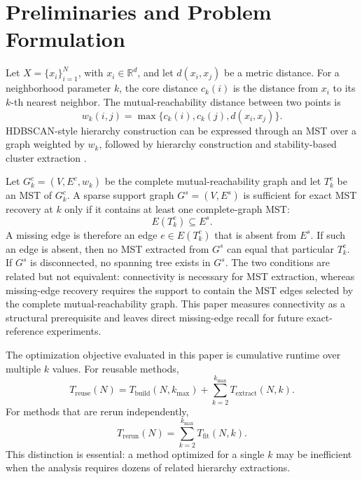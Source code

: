 \documentclass[11pt]{article}
\begin{document}
\section{Preliminaries and Problem Formulation}

Let \(X=\{x_i\}_{i=1}^{N}\), with \(x_i \in \mathbb{R}^{d}\), and let \(d(x_i,x_j)\) be a metric distance. For a neighborhood parameter \(k\), the core distance \(c_k(i)\) is the distance from \(x_i\) to its \(k\)-th nearest neighbor. The mutual-reachability distance between two points is
\begin{equation}
  w_k(i,j) = \max\{c_k(i), c_k(j), d(x_i,x_j)\}.
\end{equation}
HDBSCAN-style hierarchy construction can be expressed through an MST over a graph weighted by \(w_k\), followed by hierarchy construction and stability-based cluster extraction \citep{campello2015hierarchical}.

Let \(G^c_k=(V,E^c,w_k)\) be the complete mutual-reachability graph and let \(T^c_k\) be an MST of \(G^c_k\). A sparse support graph \(G^s=(V,E^s)\) is sufficient for exact MST recovery at \(k\) only if it contains at least one complete-graph MST:
\begin{equation}
  E(T^c_k) \subseteq E^s.
\end{equation}
A missing edge is therefore an edge \(e \in E(T^c_k)\) that is absent from \(E^s\). If such an edge is absent, then no MST extracted from \(G^s\) can equal that particular \(T^c_k\). If \(G^s\) is disconnected, no spanning tree exists in \(G^s\). The two conditions are related but not equivalent: connectivity is necessary for MST extraction, whereas missing-edge recovery requires the support to contain the MST edges selected by the complete mutual-reachability graph. This paper measures connectivity as a structural prerequisite and leaves direct missing-edge recall for future exact-reference experiments.

The optimization objective evaluated in this paper is cumulative runtime over multiple \(k\) values. For reusable methods,
\begin{equation}
  T_{\mathrm{reuse}}(N) = T_{\mathrm{build}}(N,k_{\max}) + \sum_{k=2}^{k_{\max}} T_{\mathrm{extract}}(N,k).
\end{equation}
For methods that are rerun independently,
\begin{equation}
  T_{\mathrm{rerun}}(N) = \sum_{k=2}^{k_{\max}} T_{\mathrm{fit}}(N,k).
\end{equation}
This distinction is essential: a method optimized for a single \(k\) may be inefficient when the analysis requires dozens of related hierarchy extractions.
\end{document}

